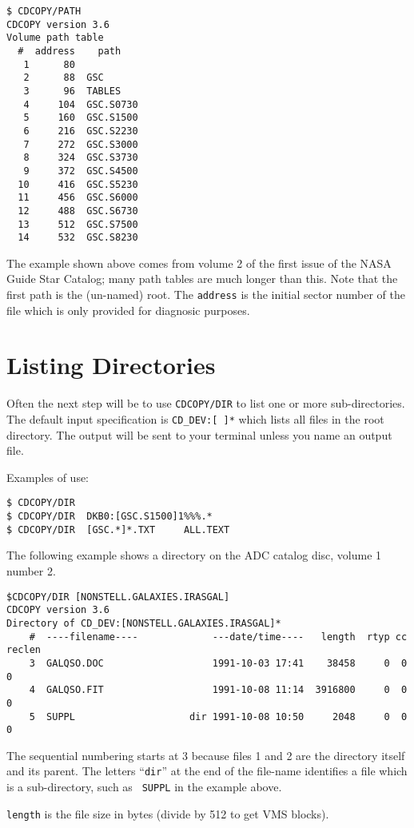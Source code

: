 \goodbreak
\begin{verbatim}
$ CDCOPY/PATH
CDCOPY version 3.6
Volume path table
  #  address    path
   1      80   
   2      88  GSC
   3      96  TABLES
   4     104  GSC.S0730
   5     160  GSC.S1500
   6     216  GSC.S2230
   7     272  GSC.S3000
   8     324  GSC.S3730
   9     372  GSC.S4500
  10     416  GSC.S5230
  11     456  GSC.S6000
  12     488  GSC.S6730
  13     512  GSC.S7500
  14     532  GSC.S8230
\end{verbatim}
The example shown above comes from volume 2 of the first issue of the
NASA Guide Star Catalog; many path tables are much longer than this.
Note that the first path is the (un-named) root.  The {\tt address} is
the initial sector number of the file which is only provided
for diagnosic purposes. 

\section{Listing Directories}

Often the next step will be to use {\tt CDCOPY/DIR} to list one or more
sub-directories.  The default input specification is {\tt CD\_DEV:[ ]*}
which lists all files in the root directory.  The output will be sent to
your terminal unless you name an output file. 

Examples of use:
\begin{verbatim}
$ CDCOPY/DIR  
$ CDCOPY/DIR  DKB0:[GSC.S1500]1%%%.*
$ CDCOPY/DIR  [GSC.*]*.TXT     ALL.TEXT
\end{verbatim}
The following example shows a directory on the ADC catalog disc, volume 
1 number 2.
\goodbreak
\begin{verbatim}
$CDCOPY/DIR [NONSTELL.GALAXIES.IRASGAL] 
CDCOPY version 3.6
Directory of CD_DEV:[NONSTELL.GALAXIES.IRASGAL]*
    #  ----filename----             ---date/time----   length  rtyp cc reclen
    3  GALQSO.DOC                   1991-10-03 17:41    38458     0  0     0
    4  GALQSO.FIT                   1991-10-08 11:14  3916800     0  0     0
    5  SUPPL                    dir 1991-10-08 10:50     2048     0  0     0
\end{verbatim}

The sequential numbering starts at 3 because files 1 and 2 are the
directory itself and its parent.  The letters ``{\tt dir}'' at the end
of the file-name identifies a file which is a sub-directory, such as {\tt
SUPPL} in the example above.  

{\tt length} is the file size in bytes (divide by 512 to get VMS
blocks). 

